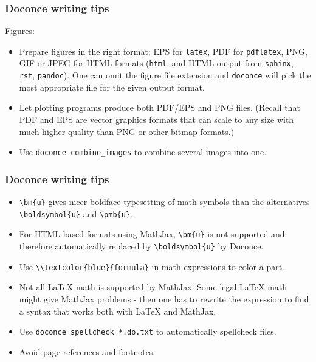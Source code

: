 \documentclass{beamer}
\newcounter{doconce:exercise:counter}
\newcounter{doconce:movie:counter}
\begin{document}
\begin{frame}
\frametitle{Doconce writing tips}


Figures:

\begin{itemize}
 \item Prepare figures in the right format: EPS for \Verb!latex!, PDF for \Verb!pdflatex!,
   PNG, GIF or JPEG for HTML formats (\Verb!html!, and HTML output from
   \Verb!sphinx!, \Verb!rst!, \Verb!pandoc!). One can omit the figure file extension and
   \Verb!doconce! will pick the most appropriate file for the given output format.

 \item Let plotting programs produce both PDF/EPS and PNG files.
   (Recall that PDF and EPS are vector graphics formats that can scale to
   any size with much higher quality than PNG or other bitmap formats.)

 \item Use \Verb!doconce combine_images! to combine several images into one.
\end{itemize}

\noindent
\end{frame}

\begin{frame}
\frametitle{Doconce writing tips}

\begin{itemize}
 \item \Verb!\bm{u}! gives nicer boldface typesetting of math symbols than
   the alternatives \Verb!\boldsymbol{u}! and \Verb!\pmb{u}!.

 \item For HTML-based formats using MathJax, \Verb!\bm{u}! is not supported
   and therefore automatically replaced by \Verb!\boldsymbol{u}! by Doconce.

 \item Use \Verb!\\textcolor{blue}{formula}! in math expressions to color a part.

 \item Not all {\LaTeX} math is supported by MathJax. Some legal {\LaTeX} math
   might give MathJax problems - then one has to rewrite the expression
   to find a syntax that works both with {\LaTeX} and MathJax.

 \item Use \Verb!doconce spellcheck *.do.txt! to automatically spellcheck files.

 \item Avoid page references and footnotes.
\end{itemize}

\noindent
\end{frame}
\end{document}
